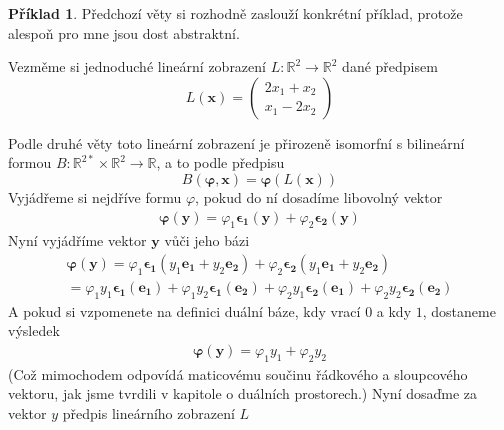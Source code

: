 \documentclass[a5paper,12pt]{amsbook}
\theoremstyle{definition}
\newtheorem{example}{Příklad}[chapter]
\newcommand{\myvec}[1]{\mathbf{#1}}
\newcommand{\myspace}[1]{\mathbb{#1}}
\begin{document}
\begin{example}
\noindent
Předchozí věty si rozhodně zaslouží konkrétní příklad, protože alespoň pro mne jsou dost
abstraktní.

Vezměme si jednoduché lineární zobrazení $L: \myspace{R}^2\rightarrow\myspace{R}^2$ dané předpisem
\begin{equation*}
L(\myvec{x}) = \left(
\begin{array}{c}
2 x_1 + x_2 \\
x_1 - 2 x_2
\end{array}
\right)
\end{equation*}

Podle druhé věty toto lineární zobrazení je přirozeně isomorfní s bilineární formou
$B: \myspace{R}^{2*}\times\myspace{R}^2\rightarrow\myspace{R}$, a to podle předpisu
\begin{equation*}
B(\myvec{\varphi}, \myvec{x}) = \myvec{\varphi}(L(\myvec{x}))
\end{equation*}
Vyjádřeme si nejdříve formu $\varphi$, pokud do ní dosadíme libovolný vektor
\begin{equation*}
\begin{split}
\myvec{\varphi}(\myvec{y}) = \varphi_1\myvec{\epsilon_1}(\myvec{y}) + \varphi_2\myvec{\epsilon_2}(\myvec{y})
\end{split}
\end{equation*}
Nyní vyjádříme vektor $\myvec{y}$ vůči jeho bázi
\begin{equation*}
\begin{split}
\myvec{\varphi}(\myvec{y}) 
  = \varphi_1\myvec{\epsilon_1}(y_1\myvec{e_1} + y_2\myvec{e_2}) + \varphi_2\myvec{\epsilon_2}(y_1\myvec{e_1} + y_2\myvec{e_2}) \\
= \varphi_1 y_1\myvec{\epsilon_1}(\myvec{e_1}) + \varphi_1 y_2\myvec{\epsilon_1}(\myvec{e_2}) 
  + \varphi_2 y_1\myvec{\epsilon_2}(\myvec{e_1}) + \varphi_2 y_2\myvec{\epsilon_2}(\myvec{e_2})
\end{split}
\end{equation*}
A pokud si vzpomenete na definici duální báze, kdy vrací $0$ a kdy $1$, dostaneme výsledek
\begin{equation*}
\begin{split}
\myvec{\varphi}(\myvec{y}) = \varphi_1 y_1 + \varphi_2 y_2
\end{split}
\end{equation*}
(Což mimochodem odpovídá maticovému součinu řádkového a sloupcového vektoru, jak jsme tvrdili v kapitole
o duálních prostorech.) Nyní dosaďme za vektor $y$ předpis lineárního zobrazení $L$

\end{example}
\end{document}
